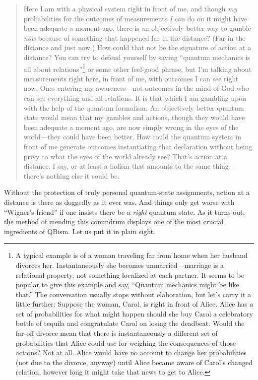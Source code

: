 \documentclass[aps,pra,superscriptaddress,12pt,tightenlines,nofootinbib]{revtex4-2}
\begin{document}
\begin{quote}
 Here I am with a physical system right in front of me, and though {\it my\/} probabilities for the outcomes of measurements {\it I\/} can do on it might have been adequate a moment ago, there is an objectively better way to gamble {\it now\/} because of something that happened far in the distance?  (Far in the distance and just now.)  How could that not be the signature of action at a distance?  You can try to defend yourself by saying ``quantum mechanics is all about relations''\footnote{A typical example is of a woman traveling far from home when her husband divorces her.  Instantaneously she becomes unmarried---marriage is a relational property, not something localized at each partner.  It seems to be popular to give this example and say, ``Quan\-tum mechanics might be like that.''  The conversation usually stops without elaboration, but let's carry it a little further:  Suppose the woman, Carol, is right in front of Alice.  Alice has a set of probabilities for what might happen should she buy Carol a celebratory bottle of tequila and congratulate Carol on losing the deadbeat.  Would the far-off divorce mean that there is instantaneously a different set of probabilities that Alice could use for weighing the consequences of those actions?  Not at all.  Alice would have no account to change her probabilities (not due to the divorce, anyway) until Alice became aware of Carol's changed relation, however long it might take that news to get to Alice.} or some other feel-good phrase, but I'm talking about measurements right here, in front of me, with outcomes I can see right now.  Ones entering my awareness---not outcomes in the mind of God who can see everything and all relations.  It is that which I am gambling upon with the help of the quantum formalism.  An objectively better quantum state would mean that my gambles and actions, though they would have been adequate a moment ago, are now simply wrong in the eyes of the world---they could have been better.  How could the quantum system in front of me generate outcomes instantiating that declaration without being privy to what the eyes of the world already see?  That's action at a distance, I say, or at least a holism that amounts to the same thing---there's nothing else it could be.
\end{quote}

Without the protection of truly personal quantum-state assignments, action at a distance is there as doggedly as it ever was.  And things only get worse with ``Wigner's friend'' if one insists there be a {\it right\/} quantum state.  As it turns out, the method of mending this conundrum displays one of the most crucial ingredients of QBism.  Let us put it in plain sight.
\end{document}
